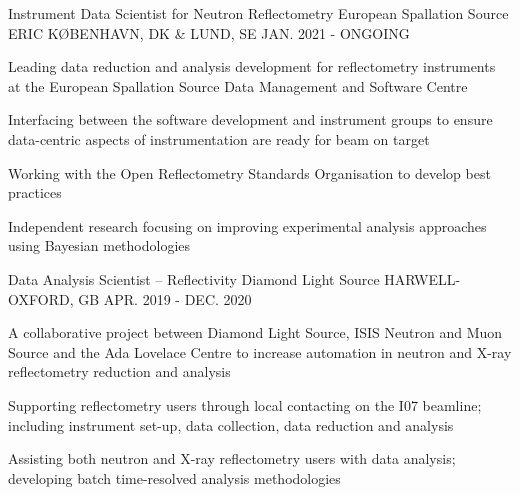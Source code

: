 \begin{cventries}
  \cventry
    {Instrument Data Scientist for Neutron Reflectometry}
    {European Spallation Source ERIC}
    {K\O BENHAVN, DK \& LUND, SE}
    {JAN. 2021 - ONGOING}
    {
      \begin{cvitems}
        \item {Leading data reduction and analysis development for reflectometry instruments at the European Spallation Source Data Management and Software Centre}
        \item {Interfacing between the software development and instrument groups to ensure data-centric aspects of instrumentation are ready for beam on target}
        \item {Working with the Open Reflectometry Standards Organisation to develop best practices}
        \item {Independent research focusing on improving experimental analysis approaches using Bayesian methodologies}
      \end{cvitems}
    }
  \cventry
    {Data Analysis Scientist -- Reflectivity}
    {Diamond Light Source}
    {HARWELL-OXFORD, GB}
    {APR. 2019 - DEC. 2020}
    {
      \begin{cvitems}
        \item {A collaborative project between Diamond Light Source, ISIS Neutron and Muon Source and the Ada Lovelace Centre to increase automation in neutron and X-ray reflectometry reduction and analysis}
        \item {Supporting reflectometry users through local contacting on the I07 beamline; including instrument set-up, data collection, data reduction and analysis}
        \item {Assisting both neutron and X-ray reflectometry users with data analysis; developing batch time-resolved analysis methodologies}
      \end{cvitems}
    }
\end{cventries}
